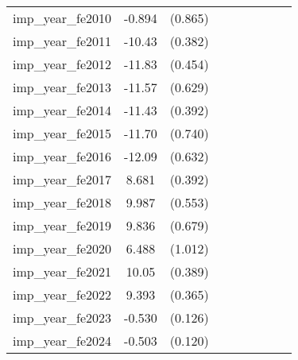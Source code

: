 {\begin{tabular}{l*{4}{cc}}
imp\_year\_fe2010&   -0.894         &  (0.865)&                  &         &                  &         &                  &         \\
imp\_year\_fe2011&   -10.43\sym{***}&  (0.382)&                  &         &                  &         &                  &         \\
imp\_year\_fe2012&   -11.83\sym{***}&  (0.454)&                  &         &                  &         &                  &         \\
imp\_year\_fe2013&   -11.57\sym{***}&  (0.629)&                  &         &                  &         &                  &         \\
imp\_year\_fe2014&   -11.43\sym{***}&  (0.392)&                  &         &                  &         &                  &         \\
imp\_year\_fe2015&   -11.70\sym{***}&  (0.740)&                  &         &                  &         &                  &         \\
imp\_year\_fe2016&   -12.09\sym{***}&  (0.632)&                  &         &                  &         &                  &         \\
imp\_year\_fe2017&    8.681\sym{***}&  (0.392)&                  &         &                  &         &                  &         \\
imp\_year\_fe2018&    9.987\sym{***}&  (0.553)&                  &         &                  &         &                  &         \\
imp\_year\_fe2019&    9.836\sym{***}&  (0.679)&                  &         &                  &         &                  &         \\
imp\_year\_fe2020&    6.488\sym{***}&  (1.012)&                  &         &                  &         &                  &         \\
imp\_year\_fe2021&    10.05\sym{***}&  (0.389)&                  &         &                  &         &                  &         \\
imp\_year\_fe2022&    9.393\sym{***}&  (0.365)&                  &         &                  &         &                  &         \\
imp\_year\_fe2023&   -0.530\sym{***}&  (0.126)&                  &         &                  &         &                  &         \\
imp\_year\_fe2024&   -0.503\sym{***}&  (0.120)&                  &         &                  &         &                  &         \\

\end{tabular}}
